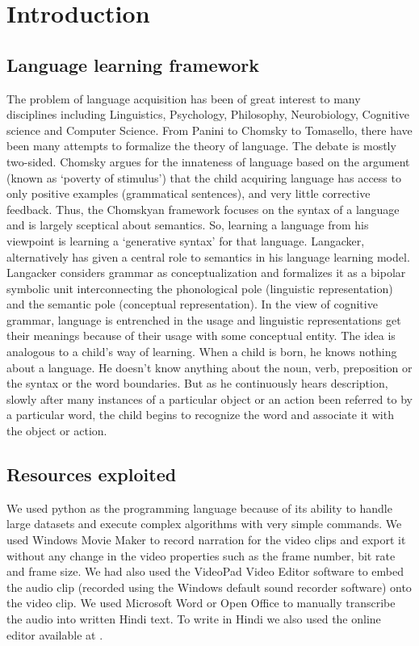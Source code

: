 \documentclass[12pt, a4paper]{report}
\begin{document}
\chapter{Introduction}
\section{Language learning framework}
The problem of language acquisition has been of great interest to many disciplines including Linguistics, Psychology, Philosophy, Neurobiology, Cognitive science and Computer Science. From Panini\cite{panini} to Chomsky\cite{chomsky} to Tomasello, there have been many attempts to formalize the theory of language. The debate is mostly two-sided. Chomsky\cite{chomsky} argues for the innateness of language based on the argument (known as `poverty of stimulus') that the child acquiring language has access to only positive examples (grammatical sentences), and very little corrective feedback. Thus, the Chomskyan framework focuses on the syntax of a language and is largely sceptical about semantics. So, learning a language from his viewpoint is learning a `generative syntax' for that language. Langacker\cite{langacker}, alternatively has given a central role to semantics in his language learning model. Langacker\cite{langacker} considers grammar as conceptualization and formalizes it as a bipolar symbolic unit interconnecting the phonological pole (linguistic representation) and the semantic pole (conceptual representation). In the view of cognitive grammar, language is entrenched in the usage and linguistic representations get their meanings because of their usage with some conceptual entity.
The idea is analogous to a child’s way of learning. When a child is born, he knows nothing about a language. He doesn’t know anything about the noun, verb, preposition or the syntax or the word boundaries. But as he continuously hears description, slowly after many instances of a particular object or an action been referred to by a particular word, the child begins to recognize the word and associate it with the object or action. 

\section{Resources exploited}
We used python as the programming language because of its ability to handle large datasets and execute complex algorithms with very simple commands. We used Windows Movie Maker to record narration for the video clips and export it without any change in the video properties such as the frame number, bit rate and frame size. We had also used the VideoPad Video Editor software to embed the audio clip (recorded using the Windows default sound recorder software) onto the video clip. We used Microsoft Word or Open Office to manually transcribe the audio into written Hindi text. To write in Hindi we also used the online editor available at \cite{quill}. 
\end{document}
